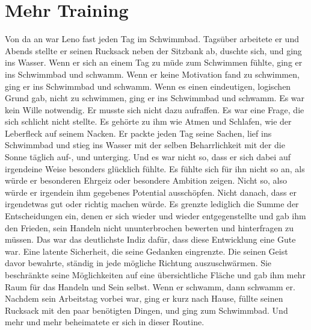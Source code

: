 \documentclass[ngerman,smalldemyvopaper,11pt,oneside,onecolumn,openright,extrafontsizes]{memoir}
\begin{document}
\chapter{Mehr Training}
Von da an war Leno fast jeden Tag im Schwimmbad. Tagsüber arbeitete er und Abends stellte er seinen Rucksack neben der Sitzbank ab, duschte sich, und ging ins Wasser. Wenn er sich an einem Tag zu müde zum Schwimmen fühlte, ging er ins Schwimmbad und schwamm. Wenn er keine Motivation fand zu schwimmen, ging er ins Schwimmbad und schwamm. Wenn es einen eindeutigen, logischen Grund gab, nicht zu schwimmen, ging er ins Schwimmbad und schwamm. Es war kein Wille notwendig. Er musste sich nicht dazu aufraffen. Es war eine Frage, die sich schlicht nicht stellte. Es gehörte zu ihm wie Atmen und Schlafen, wie der Leberfleck auf seinem Nacken. Er packte jeden Tag seine Sachen, lief ins Schwimmbad und stieg ins Wasser mit der selben Beharrlichkeit mit der die Sonne täglich auf-, und unterging. Und es war nicht so, dass er sich dabei auf irgendeine Weise besonders glücklich fühlte. Es fühlte sich für ihn nicht so an, als würde er besonderen Ehrgeiz oder besondere Ambition zeigen. Nicht so, also würde er irgendein ihm gegebenes Potential ausschöpfen. Nicht danach, dass er irgendetwas gut oder richtig machen würde. Es grenzte lediglich die Summe der Entscheidungen ein, denen er sich wieder und wieder entgegenstellte und gab ihm den Frieden, sein Handeln nicht ununterbrochen bewerten und hinterfragen zu müssen. Das war das deutlichste Indiz dafür, dass diese Entwicklung eine Gute war. Eine latente Sicherheit, die seine Gedanken eingrenzte. Die seinen Geist davor bewahrte, ständig in jede mögliche Richtung auszuschwärmen. Sie beschränkte seine Möglichkeiten auf eine übersichtliche Fläche und gab ihm mehr Raum für das Handeln und Sein selbst. Wenn er schwamm, dann schwamm er. Nachdem sein Arbeitstag vorbei war, ging er kurz nach Hause, füllte seinen Rucksack mit den paar benötigten Dingen, und ging zum Schwimmbad. Und mehr und mehr beheimatete er sich in dieser Routine.\\
\end{document}
